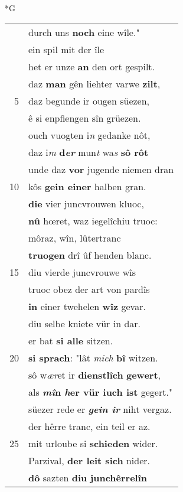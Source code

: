 \documentclass[8pt,a4paper,notitlepage]{article}
\begin{document}
\begin{table}[ht]
\begin{minipage}[t]{0.5\linewidth}
\small
\begin{center}*G
\end{center}
\begin{tabular}{rl}
 & durch uns \textbf{noch} eine wîle."\\ 
 & ein spil mit der île\\ 
 & het er unze \textbf{an} den ort gespilt.\\ 
 & daz \textbf{man} gên liehter varwe \textbf{zilt},\\ 
5 & daz begunde ir ougen süezen,\\ 
 & ê si enpfiengen sîn grüezen.\\ 
 & ouch vuogten i\textit{n} gedanke nôt,\\ 
 & daz i\textit{m} \textbf{d\textit{er}} mun\textit{t} wa\textit{s} \textbf{sô rôt}\\ 
 & unde daz \textbf{vor} jugende niemen dran\\ 
10 & kôs \textbf{gein einer} halben gran.\\ 
 & \textbf{die} vier juncvrouwen kluoc,\\ 
 & \textbf{nû} hœret, waz iegelîchiu truoc:\\ 
 & môraz, wîn, lûtertranc\\ 
 & \textbf{truogen} drî ûf henden blanc.\\ 
15 & diu vierde juncvrouwe wîs\\ 
 & truoc obez der art von pardîs\\ 
 & \textbf{in} einer twehelen \textbf{wîz} gevar.\\ 
 & diu selbe kniete vür in dar.\\ 
 & er bat \textbf{si alle} sitzen.\\ 
20 & \textbf{si sprach}: "lât \textit{mich} \textbf{bî} witzen.\\ 
 & sô w\textit{ær}et ir \textbf{dienstlîch} \textbf{gewert},\\ 
 & als \textbf{\textit{mî}n \textit{h}er vür iuch ist} gegert."\\ 
 & süezer rede er \textit{\textbf{gein ir}} niht vergaz.\\ 
 & der hêrre tranc, ein teil er az.\\ 
25 & mit urloube si \textbf{schieden} wider.\\ 
 & Parzival, \textbf{der leit sich} nider.\\ 
 & \textbf{dô} sazten \textbf{diu} \textbf{junchêrrelîn}\\ 

\end{tabular}
\end{minipage}
\end{table}
\end{document}
